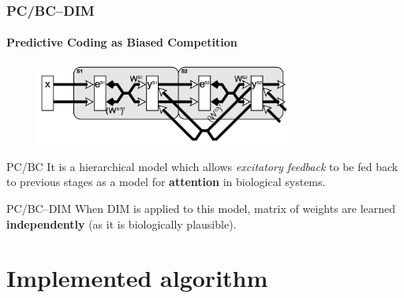\documentclass{beamer}
\begin{document}
			\begin{frame}
				\frametitle{PC/BC--DIM}
				\framesubtitle{Predictive Coding as Biased Competition}  
				\begin{figure}[h]
					\centering
					\includegraphics[width=0.75\textwidth]{pcbc}
				\end{figure}
				\begin{small}
					\begin{block}{PC/BC}
						It is a hierarchical model which allows \emph{excitatory feedback} to be fed back to previous stages as a model for \textbf{attention} in biological systems.
					\end{block}
					\begin{block}{PC/BC--DIM}
						When DIM is applied to this model, matrix of weights are learned \textbf{independently} (as it is biologically plausible).
					\end{block}
				\end{small}
			\end{frame}
				
		
	\section{Implemented algorithm}
\end{document}
